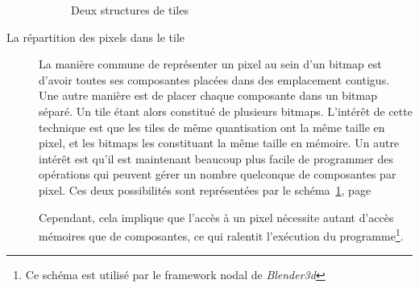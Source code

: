 \begin{description}
			\begin{figure}[h]
				\centering
				\caption{Deux structures de tiles}
				\label{fig:tilestruct}
			\end{figure}
				\item[La répartition des pixels dans le tile] La manière commune de représenter un pixel au sein d'un bitmap est d'avoir
				toutes ses composantes placées dans des emplacement contigus. Une autre manière est de placer chaque composante dans un
				bitmap séparé. Un tile étant alors constitué de plusieurs bitmaps. L'intérêt de cette technique est que les tiles de même
				quantisation ont la même taille en pixel, et les bitmaps les constituant la même taille en mémoire. Un autre intérêt est
				qu'il est maintenant beaucoup plus facile de programmer des opérations qui peuvent gérer un nombre quelconque de composantes
				par pixel. Ces deux possibilités sont représentées par le schéma~\ref{fig:tilestruct}, page~\pageref{fig:tilestruct}

				Cependant, cela implique que l'accès à un pixel nécessite autant d'accès mémoires que de composantes, ce qui ralentit 
				l'exécution du programme\footnote{Ce schéma est utilisé par le framework nodal de \emph{Blender3d}}. 
			\end{description}

